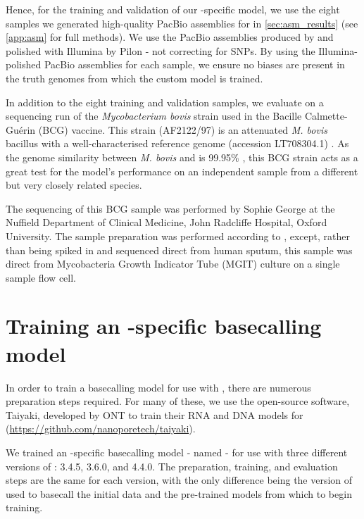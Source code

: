 Hence, for the training and validation of our \mtb{}-specific model, we use the eight samples we generated high-quality PacBio assemblies for in \autoref{sec:asm_results} (see \autoref{app:asm} for full methods). We use the PacBio assemblies produced by \flye{} and polished with Illumina by Pilon - not correcting for SNPs. By using the Illumina-polished PacBio assemblies for each sample, we ensure no \ont{} biases are present in the truth genomes from which the custom model is trained.

In addition to the eight training and validation samples, we evaluate on a \ont{} sequencing run of the \textit{Mycobacterium bovis} strain used in the Bacille Calmette-Guérin (BCG) vaccine. This strain (AF2122/97) is an attenuated \textit{M. bovis} bacillus \cite{luca2013} with a well-characterised reference genome (accession LT708304.1) \cite{Malone2017}. As the genome similarity between \textit{M. bovis} and \mtb{} is 99.95\% \cite{Kanipe2020}, this BCG strain acts as a great test for the model's performance on an independent sample from a different but very closely related species.

The \ont{} sequencing of this BCG sample was performed by Sophie George at the Nuffield Department of Clinical Medicine, John Radcliffe Hospital, Oxford University. The sample preparation was performed according to \cite{George2020}, except, rather than being spiked in and sequenced direct from human sputum, this sample was direct from Mycobacteria Growth Indicator Tube (MGIT) culture on a single sample flow cell.

\section{Training an \mtb{}-specific \ont{} basecalling model}

In order to train a basecalling model for use with \guppy{}, there are numerous preparation steps required. For many of these, we use the open-source software, Taiyaki, developed by ONT to train their RNA and DNA models for \guppy{} (\url{https://github.com/nanoporetech/taiyaki}).

We trained an \mtb{}-specific basecalling model - named \tubby{} - for use with three different versions of \guppy{}: 3.4.5, 3.6.0, and 4.4.0. The preparation, training, and evaluation steps are the same for each version, with the only difference being the version of \guppy{} used to basecall the initial data and the pre-trained models from which to begin training.

